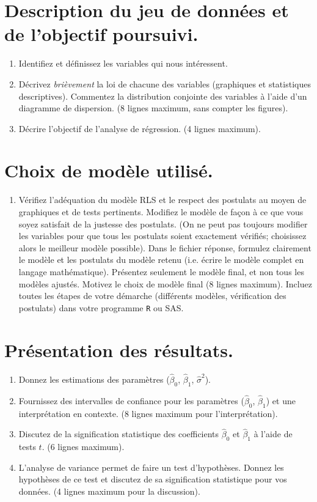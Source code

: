 \begin{questions}
\begin{parts}
	\part[9] {\bf Description du jeu de données et de l'objectif poursuivi.}
\begin{enumerate}
\item Identifiez et définissez les variables qui nous intéressent.
\item Décrivez {\it brièvement} la loi de chacune des variables (graphiques et statistiques descriptives). Commentez la distribution conjointe des variables à l'aide d'un diagramme de dispersion.  (8 lignes maximum, sans compter les figures).


\item Décrire l'objectif de l'analyse de régression. (4 lignes maximum).
\end{enumerate}
	\part[14] {\bf Choix de modèle utilisé.}
\begin{enumerate}
	\item Vérifiez l'adéquation du modèle RLS et le respect des postulats au moyen de graphiques et de tests pertinents. Modifiez le modèle de façon à ce que vous soyez satisfait de la justesse des postulats. (On ne peut pas toujours modifier les variables pour que tous les postulats soient exactement vérifiés;  choisissez alors le meilleur modèle possible). Dans le fichier réponse, formulez clairement le modèle et les postulats du modèle retenu (i.e. écrire le modèle complet en langage mathématique). Présentez seulement le modèle final, et non tous les modèles ajustés. Motivez le choix de modèle final (8 lignes maximum). Incluez toutes les étapes de votre démarche (différents modèles, vérification des postulats) dans votre programme \texttt{R} ou SAS. 
\end{enumerate}
	\part[17] {\bf Présentation des résultats.}
\begin{enumerate}
	\item Donnez les estimations des paramètres (${\hat \beta}_0$, ${\hat \beta}_1$, ${\hat \sigma}^2$).
	\item Fournissez des intervalles de confiance pour les paramètres (${\hat \beta}_0$, ${\hat \beta}_1$) et une interprétation en contexte. (8 lignes maximum pour l'interprétation).
	\item Discutez de la signification statistique des coefficients ${\hat \beta}_0$ et ${\hat \beta}_1$ à l'aide de tests $t$. (6 lignes maximum).
	\item L'analyse de variance permet de faire un test d'hypothèses. Donnez les hypothèses de ce test et discutez de sa signification statistique pour vos données. (4 lignes maximum pour la discussion).
\end{enumerate}
\end{parts}



\end{questions}
